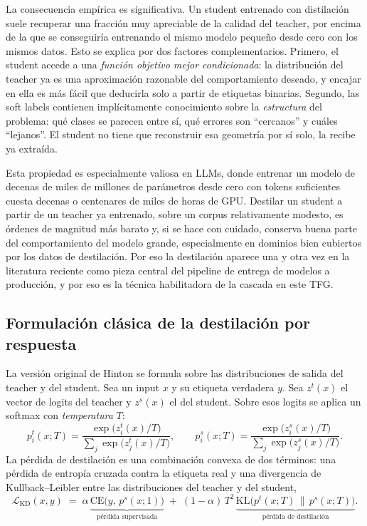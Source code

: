 \documentclass[11pt,a4paper]{article}
\begin{document}
La consecuencia empírica es significativa. Un student entrenado con distilación suele recuperar una fracción muy apreciable de la calidad del teacher, por encima de la que se conseguiría entrenando el mismo modelo pequeño desde cero con los mismos datos. Esto se explica por dos factores complementarios. Primero, el student accede a una \emph{función objetivo mejor condicionada}: la distribución del teacher ya es una aproximación razonable del comportamiento deseado, y encajar en ella es más fácil que deducirla solo a partir de etiquetas binarias. Segundo, las soft labels contienen implícitamente conocimiento sobre la \emph{estructura} del problema: qué clases se parecen entre sí, qué errores son ``cercanos'' y cuáles ``lejanos''. El student no tiene que reconstruir esa geometría por sí solo, la recibe ya extraída.

Esta propiedad es especialmente valiosa en LLMs, donde entrenar un modelo de decenas de miles de millones de parámetros desde cero con tokens suficientes cuesta decenas o centenares de miles de horas de GPU. Destilar un student a partir de un teacher ya entrenado, sobre un corpus relativamente modesto, es órdenes de magnitud más barato y, si se hace con cuidado, conserva buena parte del comportamiento del modelo grande, especialmente en dominios bien cubiertos por los datos de destilación. Por eso la destilación aparece una y otra vez en la literatura reciente como pieza central del pipeline de entrega de modelos a producción, y por eso es la técnica habilitadora de la cascada en este TFG.

\subsection{Formulación clásica de la destilación por respuesta}

La versión original de Hinton se formula sobre las distribuciones de salida del teacher y del student. Sea un input $x$ y su etiqueta verdadera $y$. Sea $z^t(x)$ el vector de logits del teacher y $z^s(x)$ el del student. Sobre esos logits se aplica un softmax con \emph{temperatura} $T$:
\[
p^t_i(x; T) = \frac{\exp\!\big(z^t_i(x)/T\big)}{\sum_j \exp\!\big(z^t_j(x)/T\big)}, \qquad
p^s_i(x; T) = \frac{\exp\!\big(z^s_i(x)/T\big)}{\sum_j \exp\!\big(z^s_j(x)/T\big)}.
\]
La pérdida de destilación es una combinación convexa de dos términos: una pérdida de entropía cruzada contra la etiqueta real y una divergencia de Kullback--Leibler entre las distribuciones del teacher y del student,
\[
\mathcal{L}_{\mathrm{KD}}(x, y) \;=\; \alpha \, \underbrace{\mathrm{CE}\!\big(y,\, p^s(x;1)\big)}_{\text{pérdida supervisada}} \;+\; (1-\alpha)\, T^2 \, \underbrace{\mathrm{KL}\!\big(p^t(x;T)\,\|\,p^s(x;T)\big)}_{\text{pérdida de destilación}}.
\]
\end{document}
